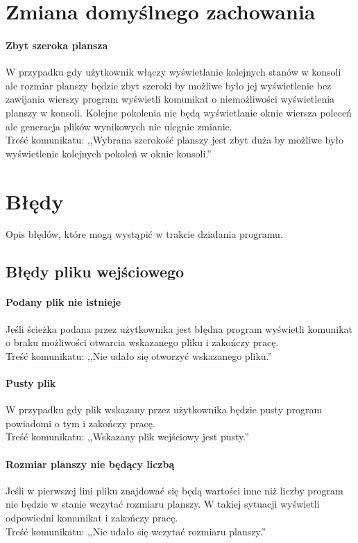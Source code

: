 \documentclass{report}
\begin{document}
\section{Zmiana domyślnego zachowania}
\paragraph{Zbyt szeroka plansza}
W przypadku gdy użytkownik włączy wyświetlanie kolejnych stanów w konsoli ale rozmiar planszy będzie zbyt szeroki by możliwe było jej wyświetlenie bez zawijania wierszy program wyświetli komunikat o niemożliwości wyświetlenia planszy w konsoli. Kolejne pokolenia nie będą wyświetlanie oknie wiersza poleceń ale generacja plików wynikowych nie ulegnie zmianie. \\
Treść komunikatu: ,,Wybrana szerokość planszy jest zbyt duża by możliwe było wyświetlenie kolejnych pokoleń w oknie konsoli.''

\section{Błędy}
Opis błędów, które mogą wystąpić w trakcie działania programu.

\subsection{Błędy pliku wejściowego}

\paragraph{Podany plik nie istnieje}
Jeśli ścieżka podana przez użytkownika jest błędna program wyświetli komunikat o braku możliwości otwarcia wskazanego pliku i zakończy pracę. \\
Treść komunikatu: ,,Nie udało się otworzyć wskazanego pliku.''

\paragraph{Pusty plik}
W przypadku gdy plik wskazany przez użytkownika będzie pusty program powiadomi o tym i zakończy pracę. \\
Treść komunikatu: ,,Wskazany plik wejściowy jest pusty.''

\paragraph{Rozmiar planszy nie będący liczbą}
Jeśli w pierwszej lini pliku znajdować się będą wartości inne niż liczby program nie będzie w stanie wczytać rozmiaru planszy. W takiej sytuacji wyświetli odpowiedni komunikat i zakończy pracę. \\
 Treść komunikatu: ,,Nie udało się wczytać rozmiaru planszy.''
 
\end{document}
